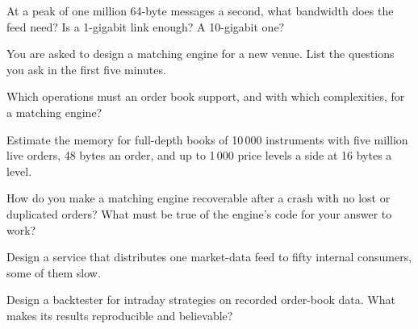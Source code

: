\begin{interviewq}\label{iq:iv:system-design:2}
At a peak of one million 64-byte messages a second, what bandwidth does the feed need? Is a 1-gigabit link enough? A 10-gigabit
one?
\end{interviewq}

\begin{interviewq}\label{iq:iv:system-design:3}
You are asked to design a matching engine for a new venue. List the questions you ask in the first five minutes.
\end{interviewq}

\begin{interviewq}\label{iq:iv:system-design:4}
Which operations must an order book support, and with which complexities, for a matching engine?
\end{interviewq}

\begin{interviewq}\label{iq:iv:system-design:5}
Estimate the memory for full-depth books of 10\,000 instruments with five million live orders, 48 bytes an order, and up to 1\,000
price levels a side at 16 bytes a level.
\end{interviewq}

\begin{interviewq}\label{iq:iv:system-design:6}
How do you make a matching engine recoverable after a crash with no lost or duplicated orders? What must be true of the engine's
code for your answer to work?
\end{interviewq}

\begin{interviewq}\label{iq:iv:system-design:7}
Design a service that distributes one market-data feed to fifty internal consumers, some of them slow.
\end{interviewq}

\begin{interviewq}\label{iq:iv:system-design:8}
Design a backtester for intraday strategies on recorded order-book data. What makes its results reproducible and believable?
\end{interviewq}

